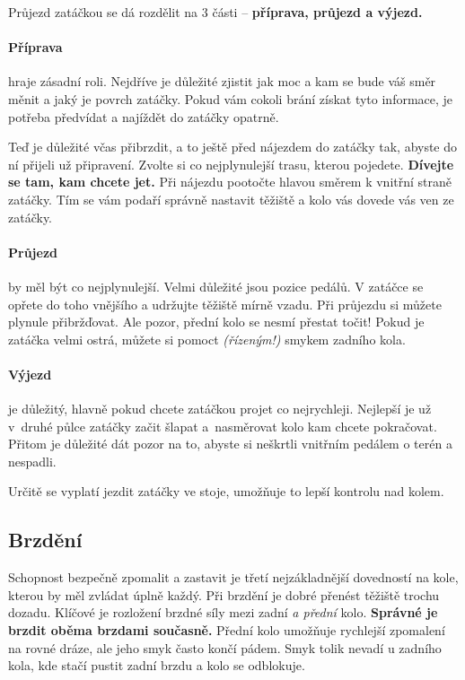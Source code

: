 \documentclass[11pt]{article}
\begin{document}
Průjezd zatáčkou se dá rozdělit na 3 části – \textbf{příprava, průjezd a výjezd.}\cite{dressler}

\paragraph*{Příprava}hraje zásadní roli. Nejdříve je důležité zjistit jak moc a kam se bude váš směr měnit a jaký je povrch zatáčky. Pokud vám cokoli brání získat tyto informace, je potřeba předvídat a najíždět do zatáčky opatrně. 

Teď je důležité včas přibrzdit, a to ještě před nájezdem do zatáčky tak, abyste do ní přijeli už připravení. Zvolte si co nejplynulejší trasu, kterou pojedete. \textbf{Dívejte se tam, kam chcete jet.} Při nájezdu pootočte hlavou směrem k vnitřní straně zatáčky. Tím se vám podaří správně nastavit těžiště a kolo vás dovede vás ven ze zatáčky. 

\paragraph*{Průjezd}by měl být co nejplynulejší. Velmi důležité jsou pozice pedálů. V zatáčce se opřete do toho vnějšího a udržujte těžiště mírně vzadu. Při průjezdu si můžete plynule přibržďovat. Ale pozor, přední kolo se nesmí přestat točit! Pokud je zatáčka velmi ostrá, můžete si pomoct \textit{(řízeným!)} smykem zadního kola.
\paragraph*{Výjezd}je důležitý, hlavně pokud chcete zatáčkou projet co nejrychleji. Nejlepší je už v~druhé půlce zatáčky začit šlapat a~nasměrovat kolo kam chcete pokračovat. Přitom je důležité dát pozor na to, abyste si neškrtli vnitřním pedálem o terén a nespadli.

Určitě se vyplatí jezdit zatáčky ve stoje, umožňuje to lepší kontrolu nad kolem.

\newpage
\subsection{Brzdění}
Schopnost bezpečně zpomalit a zastavit je třetí nejzákladnější dovedností na kole, kterou by měl zvládat úplně každý. Při brzdění je dobré přenést těžiště trochu dozadu. Klíčové je rozložení brzdné síly mezi zadní \textit{a přední} kolo. \textbf{Správné je brzdit oběma brzdami současně.} Přední kolo umožňuje rychlejší zpomalení na rovné dráze, ale jeho smyk často končí pádem. Smyk tolik nevadí u zadního kola, kde stačí pustit zadní brzdu a kolo se odblokuje. 
\end{document}
